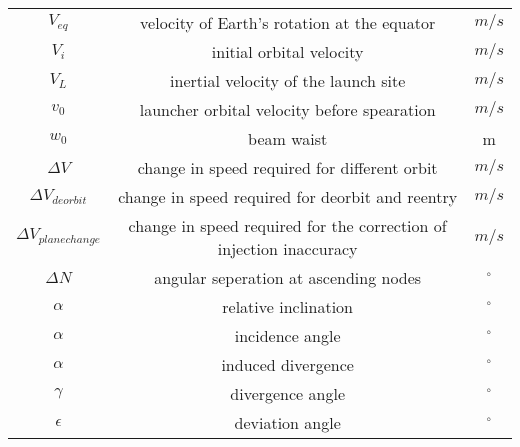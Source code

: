 \begin{center}
\begin{longtable}{c|c|c}
$V_{eq}$                            & velocity of Earth's rotation at the equator 														& $m/s$ \\

$V_i$                               & initial orbital velocity      																					& $m/s$ \\

$V_L$                               & inertial velocity of the launch site        														& $m/s$ \\

$v_0$                               & launcher orbital velocity before spearation 														& $m/s$ \\

$w_0$                       				& beam waist                                      												& m \\

$\Delta V$                           & change in speed required for different orbit 														& $m/s$ \\

$\Delta V_{deorbit}$                 & change in speed required for deorbit and reentry  											& $m/s$ \\ 

$\Delta V_{planechange}$             & change in speed required for the correction of injection inaccuracy			& $m/s$ \\ 

$\Delta N$                           & angular seperation at ascending nodes            												& $^\circ$ \\    

$\alpha$                            & relative inclination                        														& $^\circ$ \\

$\alpha$                            & incidence angle                        																	& $^\circ$ \\

$\alpha$                            & induced divergence                       																& $^\circ$ \\

$\gamma$                            & divergence angle                         																& $^\circ$ \\

$\epsilon$                         	& deviation angle                          																& $^\circ$ \\


\end{longtable}
\end{center}
